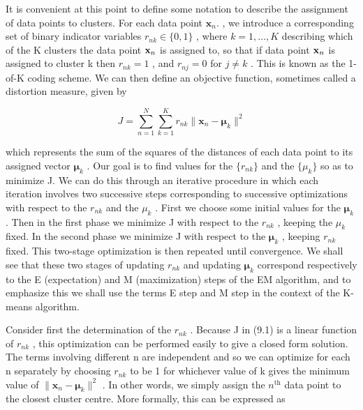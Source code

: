 \documentclass[
  10
]{article}
\begin{document}
It is convenient at this point to define some notation to describe the
assignment of data points to clusters. For each data point
\(\mathbf { x } _ { n } .\) , we introduce a corresponding set of binary
indicator variables \(r _ { n k } \in \{ 0 , 1 \}\) , where
\(k = 1 , \ldots , K\) describing which of the K clusters the data point
\({ \bf x } _ { n }\) is assigned to, so that if data point
\({ \bf x } _ { n }\) is assigned to cluster k then \(r _ { n k } = 1\)
, and \(r _ { n j } = 0\) for \(j \neq k\) . This is known as the 1-of-K
coding scheme. We can then define an objective function, sometimes
called a distortion measure, given by

\[
J = \sum_ {n = 1} ^ {N} \sum_ {k = 1} ^ {K} r _ {n k} \| \mathbf {x} _ {n} - \pmb {\mu} _ {k} \| ^ {2}\tag{9.1}
\]

which represents the sum of the squares of the distances of each data
point to its assigned vector \(\pmb { \mu } _ { k }\) . Our goal is to
find values for the \(\{ r _ { n k } \}\) and the \(\{ \mu _ { k } \}\)
so as to minimize J. We can do this through an iterative procedure in
which each iteration involves two successive steps corresponding to
successive optimizations with respect to the \(r _ { n k }\) and the
\(\mu _ { k }\) . First we choose some initial values for the
\(\pmb { \mu } _ { k }\) . Then in the first phase we minimize J with
respect to the \(r _ { n k }\) , keeping the \(\mu _ { k }\) fixed. In
the second phase we minimize J with respect to the
\(\pmb { \mu } _ { k }\) , keeping \(r _ { n k }\) fixed. This two-stage
optimization is then repeated until convergence. We shall see that these
two stages of updating \(r _ { n k }\) and updating
\(\pmb { \mu } _ { k }\) correspond respectively to the E (expectation)
and M (maximization) steps of the EM algorithm, and to emphasize this we
shall use the terms E step and M step in the context of the K-means
algorithm.

Consider first the determination of the \(r _ { n k }\) . Because J in
(9.1) is a linear function of \(r _ { n k }\) , this optimization can be
performed easily to give a closed form solution. The terms involving
different n are independent and so we can optimize for each n separately
by choosing \(r _ { n k }\) to be 1 for whichever value of k gives the
minimum value of
\(\| \mathbf { x } _ { n } - \pmb { \mu } _ { k } \| ^ { 2 }\) . In
other words, we simply assign the \(n ^ { \mathrm { t h } }\) data point
to the closest cluster centre. More formally, this can be expressed as
\end{document}
